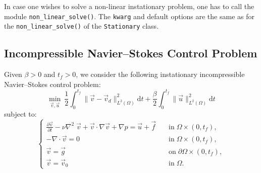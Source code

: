 \documentclass[letterpaper,10pt,english]{sphinxmanual}
\begin{document}
In case one wishes to solve a non-linear instationary problem, one has to call the module \texttt{non{\_}linear{\_}solve()}. The \texttt{kwarg} and default options are the same as for the \texttt{non{\_}linear{\_}solve()} of the \texttt{Stationary} class.



\subsection{Incompressible Navier--Stokes Control Problem}
Given $\beta>0$ and $t_f>0$, we consider the following instationary incompressible Navier--Stokes control problem:
\begin{displaymath}
\min_{\vec{v},\vec{u}} ~ \frac{1}{2} \int_0^{t_f} \| \vec{v} - \vec{v}_d \|^2_{L^2(\Omega)} \mathrm{d}t + \frac{\beta}{2} \int_0^{t_f} \| \vec{u} \|^2_{L^2(\Omega)} \mathrm{d}t
\end{displaymath}
subject to:
\begin{displaymath}
\left\{
\begin{array}{ll}
\frac{\partial \vec{v}}{\partial t} - \nu \nabla^2 \; \vec{v} + \vec{v}\cdot \nabla \vec{v} + \nabla p = \vec{u} + \vec{f} & \quad \mathrm{in} \; \Omega \times (0, t_f),\\

- \nabla \cdot \vec{v} = 0 & \quad \mathrm{in} \; \Omega \times (0, t_f),\\

\vec{v} = \vec{g} & \quad \mathrm{on} \; \partial \Omega \times (0, t_f),\\

\vec{v} = \vec{v}_0 & \quad \mathrm{in} \; \Omega.
\end{array}
\right.
\end{displaymath}
\end{document}
